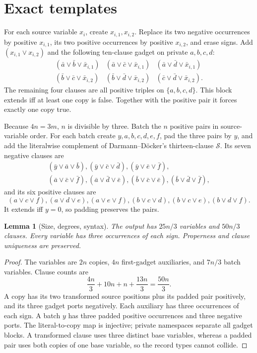 \documentclass[11pt]{article}
\newtheorem{lemma}[theorem]{Lemma}
\begin{document}
\section{Exact templates}
For each source variable \(x_i\), create \(x_{i,1},x_{i,2}\).  Replace its
two negative occurrences by positive \(x_{i,1}\), its two positive
occurrences by positive \(x_{i,2}\), and erase signs.  Add
\((x_{i,1}\vee x_{i,2})\) and the following ten-clause gadget on private
\(a,b,c,d\):
\[
\begin{array}{lll}
(\bar a\vee\bar b\vee\bar x_{i,1})&
(\bar a\vee\bar c\vee\bar x_{i,1})&
(\bar a\vee\bar d\vee\bar x_{i,1})\\
(\bar b\vee\bar c\vee\bar x_{i,2})&
(\bar b\vee\bar d\vee\bar x_{i,2})&
(\bar c\vee\bar d\vee\bar x_{i,2}).
\end{array}
\]
The remaining four clauses are all positive triples on \(\{a,b,c,d\}\).
This block extends iff at least one copy is false.  Together with the positive
pair it forces exactly one copy true.

Because \(4n=3m\), \(n\) is divisible by three.  Batch the \(n\) positive
pairs in source-variable order.  For each batch create \(y,a,b,c,d,e,f\),
pad the three pairs by \(y\), and add the literalwise complement of
Darmann--D\"ocker's thirteen-clause \(\mathcal S\).  Its seven negative
clauses are
\[
\begin{gathered}
(\bar y\vee\bar a\vee\bar b),(\bar y\vee\bar c\vee\bar d),
(\bar y\vee\bar e\vee\bar f),\\
(\bar a\vee\bar c\vee\bar f),(\bar a\vee\bar d\vee\bar e),
(\bar b\vee\bar c\vee\bar e),(\bar b\vee\bar d\vee\bar f),
\end{gathered}
\]
and its six positive clauses are
\[
(a\vee c\vee f),(a\vee d\vee e),(a\vee e\vee f),
(b\vee c\vee d),(b\vee c\vee e),(b\vee d\vee f).
\]
It extends iff \(y=0\), so padding preserves the pairs.

\begin{lemma}[Size, degrees, syntax]
The output has \(25n/3\) variables and \(50n/3\) clauses.  Every variable
has three occurrences of each sign.  Properness and clause uniqueness are
preserved.
\end{lemma}
\begin{proof}
The variables are \(2n\) copies, \(4n\) first-gadget auxiliaries, and
\(7n/3\) batch variables.  Clause counts are
\[
\frac{4n}{3}+10n+n+\frac{13n}{3}=\frac{50n}{3}.
\]
A copy has its two transformed source positions plus its padded pair
positively, and its three gadget ports negatively.  Each auxiliary has three
occurrences of each sign.  A batch \(y\) has three padded positive
occurrences and three negative ports.  The literal-to-copy map is injective;
private namespaces separate all gadget blocks.  A transformed clause uses
three distinct base variables, whereas a padded pair uses both copies of one
base variable, so the record types cannot collide.
\end{proof}
\end{document}
